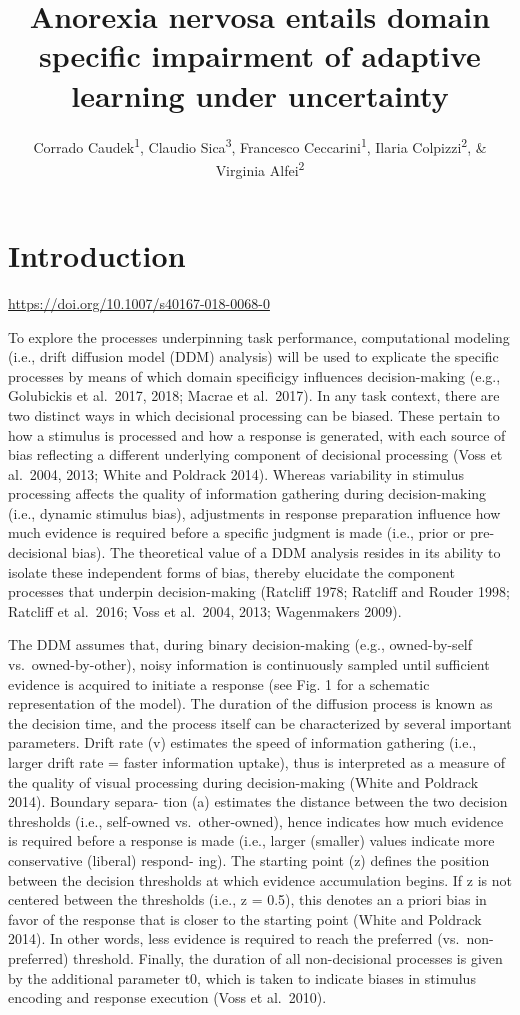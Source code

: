 \documentclass[
  man,floatsintext]{apa6}
\title{Anorexia nervosa entails domain specific impairment of adaptive learning under uncertainty}
\author{Corrado Caudek\textsuperscript{1}, Claudio Sica\textsuperscript{3}, Francesco Ceccarini\textsuperscript{1}, Ilaria Colpizzi\textsuperscript{2}, \& Virginia Alfei\textsuperscript{2}}
\date{}
\affiliation{\vspace{0.5cm}\textsuperscript{1} Department of General Psychology, University of Padova, Italy\\\textsuperscript{2} NEUROFARBA Department, Psychology Section, University of Florence, Italy\\\textsuperscript{3} Health Sciences Department, Psychology Section, University of Florence, Italy}
\begin{document}
\maketitle

\hypertarget{introduction}{%
\section{Introduction}\label{introduction}}

\url{https://doi.org/10.1007/s40167-018-0068-0}

To explore the processes underpinning task performance, computational modeling (i.e., drift diffusion model (DDM) analysis) will be used to explicate the specific processes by means of which domain specificigy influences decision-making (e.g., Golubickis et al.~2017, 2018; Macrae et al.~2017). In any task context, there are two distinct ways in which decisional processing can be biased. These pertain to how a stimulus is processed and how a response is generated, with each source of bias reflecting a different underlying component of decisional processing (Voss et al.~2004, 2013; White and Poldrack 2014). Whereas variability in stimulus processing affects the quality of information gathering during decision-making (i.e., dynamic stimulus bias), adjustments in response preparation influence how much evidence is required before a specific judgment is made (i.e., prior or pre-decisional bias). The theoretical value of a DDM analysis resides in its ability to isolate these independent forms of bias, thereby elucidate the component processes that underpin decision-making (Ratcliff 1978; Ratcliff and Rouder 1998; Ratcliff et al.~2016; Voss et al.~2004, 2013; Wagenmakers 2009).

The DDM assumes that, during binary decision-making (e.g., owned-by-self vs.~owned-by-other), noisy information is continuously sampled until sufficient evidence is acquired to initiate a response (see Fig. 1 for a schematic representation of the model). The duration of the diffusion process is known as the decision time, and the process itself can be characterized by several important parameters. Drift rate (v) estimates the speed of information gathering (i.e., larger drift rate = faster information uptake), thus is interpreted as a measure of the quality of visual processing during decision-making (White and Poldrack 2014). Boundary separa- tion (a) estimates the distance between the two decision thresholds (i.e., self-owned vs.~other-owned), hence indicates how much evidence is required before a response is made (i.e., larger (smaller) values indicate more conservative (liberal) respond- ing). The starting point (z) defines the position between the decision thresholds at which evidence accumulation begins. If z is not centered between the thresholds (i.e., z = 0.5), this denotes an a priori bias in favor of the response that is closer to the starting point (White and Poldrack 2014). In other words, less evidence is required to reach the preferred (vs.~non-preferred) threshold. Finally, the duration of all non-decisional processes is given by the additional parameter t0, which is taken to indicate biases in stimulus encoding and response execution (Voss et al.~2010).
\end{document}

